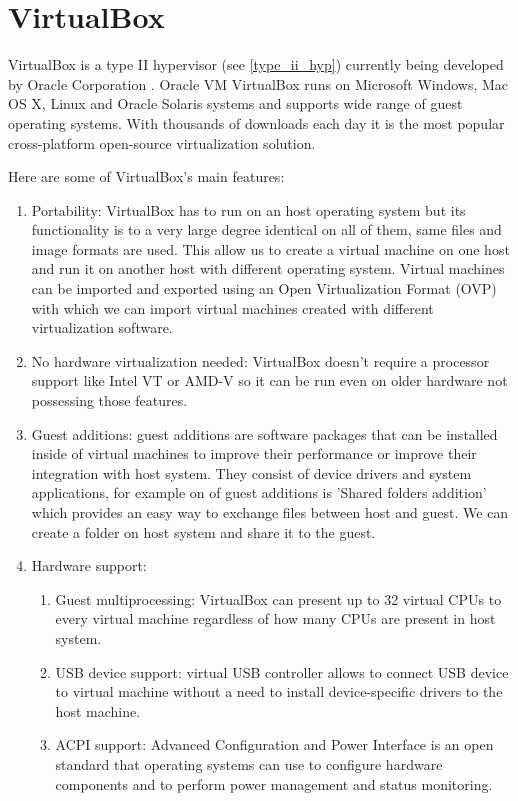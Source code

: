 \section{VirtualBox \cite{virtual_box}} 
\label{virtualbox}
VirtualBox is a type II hypervisor (see \ref{type_ii_hyp}) currently being developed by Oracle Corporation \cite{oracle}. Oracle VM VirtualBox runs on Microsoft Windows, Mac OS X, Linux and Oracle Solaris systems and supports wide range of guest operating systems. With thousands of downloads each day it is the most popular cross-platform open-source virtualization solution.

Here are some of VirtualBox's main features:
\begin{enumerate}
\item Portability: VirtualBox has to run on an host operating system but its functionality is to a very large degree identical on all of them, same files and image formats are used. This allow us to create a virtual machine on one host and run it on another host with different operating system. Virtual machines can be imported and exported using an Open Virtualization Format (OVP) with which we can import virtual machines created with different virtualization software.
\item No hardware virtualization needed: VirtualBox doesn't require a processor support like Intel VT or AMD-V so it can be run even on older hardware not possessing those features.
\item Guest additions: guest additions are software packages that can be installed inside of virtual machines to improve their performance or improve their integration with host system. They consist of device drivers and system applications, for example on of guest additions is 'Shared folders addition' which provides an easy way to exchange files between host and guest. We can create a folder on host system and share it to the guest.
\item Hardware support:
\begin{enumerate}
\item Guest multiprocessing: VirtualBox can present up to 32 virtual CPUs to every virtual machine regardless of how many CPUs are present in host system.
\item USB device support: virtual USB controller allows to connect USB device to virtual machine without a need to install device-specific drivers to the host machine.
\item ACPI support: Advanced Configuration and Power Interface is an open standard that operating systems can use to configure hardware components and to perform power management and status monitoring.

\end{enumerate}
\end{enumerate}
